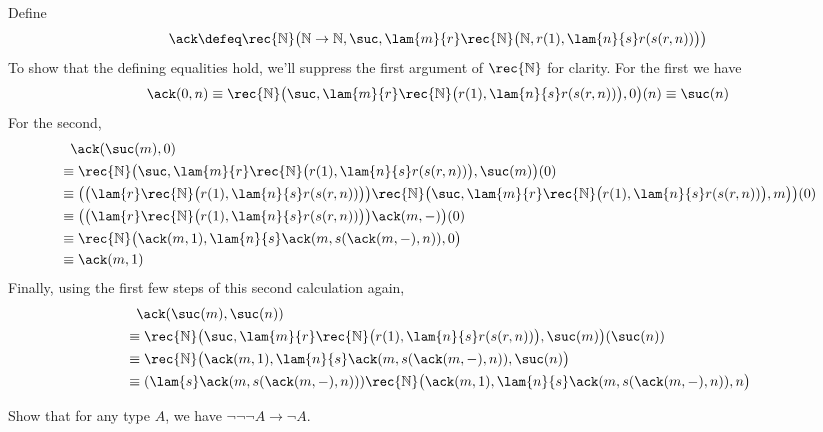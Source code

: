 \soln 
Define
\[
  \ack \defeq 
  \rec{\mathbb{N}}\big(
    \mathbb{N} \to \mathbb{N}, 
    \suc,
    \lam{m}{r}
      \rec{\mathbb{N}}\big(
        \mathbb{N},
        r(1),
        \lam{n}{s}r(s(r, n))
      \big)
  \big)
\]
To show that the defining equalities hold, we'll suppress the first argument of
$\rec{\mathbb{N}}$ for clarity.  For the first we have
\begin{align*}
  \ack(0, n)
  \equiv
  \rec{\mathbb{N}}\big(
    \suc,
    \lam{m}{r}
      \rec{\mathbb{N}}\big(
        r(1),
        \lam{n}{s}r(s(r, n))
      \big),
    0
  \big)(n)
  \equiv
  \suc(n)
\end{align*}
For the second,
\begin{align*}
  &\phantom{\equiv} \ack(\suc(m), 0)
  \\&\equiv
  \rec{\mathbb{N}}\big(
    \suc,
    \lam{m}{r}
      \rec{\mathbb{N}}\big(
        r(1),
        \lam{n}{s}r(s(r, n))
      \big),
    \suc(m)
  \big)(0)
  \\&\equiv
  \big(
  \big(\lam{r}
    \rec{\mathbb{N}}\big(
      r(1),
      \lam{n}{s}r(s(r, n))
    \big)\big)
  \rec{\mathbb{N}}\big(
    \suc,
    \lam{m}{r}
      \rec{\mathbb{N}}\big(
        r(1),
        \lam{n}{s}r(s(r, n))
      \big),
    m
  \big)
  \big)(0)
  \\&\equiv
  \big(
  \big(\lam{r}
    \rec{\mathbb{N}}\big(
      r(1),
      \lam{n}{s}r(s(r, n))
    \big)\big)
    \ack(m, -)
  \big)(0)
  \\&\equiv
  \rec{\mathbb{N}}\big(
  \ack(m, 1),
  \lam{n}{s}\ack(m, s(\ack(m, -), n)),
  0
  \big)
  \\&\equiv
  \ack(m, 1)
\end{align*}
Finally, using the first few steps of this second calculation again,
\begin{align*}
  &\phantom{\equiv} \ack(\suc(m), \suc(n))
  \\&\equiv
  \rec{\mathbb{N}}\big(
    \suc,
    \lam{m}{r}
      \rec{\mathbb{N}}\big(
        r(1),
        \lam{n}{s}r(s(r, n))
      \big),
    \suc(m)
  \big)(\suc(n))
  \\&\equiv
  \rec{\mathbb{N}}\big(
  \ack(m, 1),
  \lam{n}{s}\ack(m, s(\ack(m, -), n)),
  \suc(n)
  \big)
  \\&\equiv
  (\lam{s}\ack(m, s(\ack(m, -), n)))
  \rec{\mathbb{N}}\big(
  \ack(m, 1),
  \lam{n}{s}\ack(m, s(\ack(m, -), n)),
  n
  \big)
\end{align*}


Show that for any type $A$, we have $\lnot\lnot\lnot A \to
\lnot A$.


